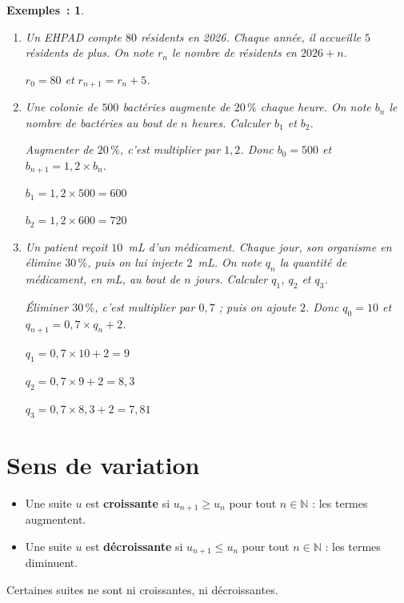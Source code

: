 \documentclass[12pt]{article}
\theoremstyle{break}
\newtheorem*{examples}{Exemples~:}
\theoremstyle{inline}
\begin{document}
\bigskip
\begin{examples}
  \begin{enumerate}
    \setlength{\itemsep}{1.5em}
    \item Un EHPAD compte $80$ résidents en 2026. Chaque année, il accueille $5$ résidents de plus.
    On note $r_n$ le nombre de résidents en $2026 + n$.

    \smallskip
    \begin{multihideW}[3em]
      $r_0 = 80$ et $r_{n+1} = r_n + 5$.
    \end{multihideW}

    \vfill
    \item Une colonie de $500$ bactéries augmente de $20\,\%$ chaque heure.
    On note $b_n$ le nombre de bactéries au bout de $n$ heures. Calculer $b_1$ et $b_2$.

    \smallskip
    \begin{multihideW}[4em]
      Augmenter de $20\,\%$, c'est multiplier par $1{,}2$. Donc $b_0 = 500$ et $b_{n+1} = 1{,}2 \times b_n$.

      $b_1 = 1{,}2 \times 500 = 600$

      $b_2 = 1{,}2 \times 600 = 720$
    \end{multihideW}

    \vfill
    \item Un patient reçoit $10$~mL d'un médicament. Chaque jour, son organisme en élimine $30\,\%$, puis on lui injecte $2$~mL.
    On note $q_n$ la quantité de médicament, en mL, au bout de $n$ jours. Calculer $q_1$, $q_2$ et $q_3$.

    \smallskip
    \begin{multihideW}[4em]
      Éliminer $30\,\%$, c'est multiplier par $0{,}7$ ; puis on ajoute $2$. Donc $q_0 = 10$ et $q_{n+1} = 0{,}7 \times q_n + 2$.

      $q_1 = 0{,}7 \times 10 + 2 = 9$

      $q_2 = 0{,}7 \times 9 + 2 = 8{,}3$

      $q_3 = 0{,}7 \times 8{,}3 + 2 = 7{,}81$
    \end{multihideW}
  \end{enumerate}
\end{examples}

\vfill
\newpage
\section{Sens de variation}

\begin{definition}{}{}
  \begin{multihide}
    \begin{itemize}
      \item Une suite $u$ est \textbf{croissante} si $u_{n+1} \geqslant u_n$ pour tout $n \in \mathbb{N}$ : les termes augmentent.
      \item Une suite $u$ est \textbf{décroissante} si $u_{n+1} \leqslant u_n$ pour tout $n \in \mathbb{N}$ : les termes diminuent.
    \end{itemize}
    Certaines suites ne sont ni croissantes, ni décroissantes.
  \end{multihide}
\end{definition}
\end{document}
